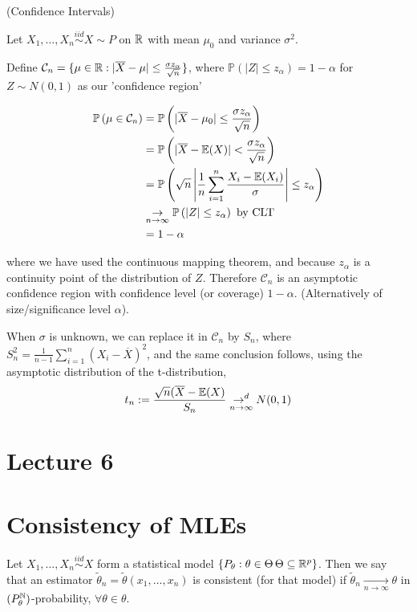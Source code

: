 \documentclass[a4paper]{article}
\begin{document}
\begin{eg} (Confidence Intervals)

	Let $X_1, \ldots, X_n \stackrel{iid}{\sim} X \sim P$ on $\mathbb{R}$ with mean  $\mu_{0}$ and variance $\sigma^2$.

	Define  $\mathcal{C}_n = \{\mu \in \mathbb{R} : |\overline{X} - \mu| \le \frac{\sigma z_{\alpha}}{\sqrt{n} }\} $, where $\mathbb{P}\left( |Z| \le z_{\alpha} \right) = 1 - \alpha $ for $Z\sim N(0,1)$ as our 'confidence region'

	\begin{align*}
		\mathbb{P}\left( \mu \in \mathcal{C}_n \right) &= \mathbb{P}\left( |\overline{X} - \mu_0| \le \frac{\sigma z_{\alpha}}{\sqrt{n} }  \right) \\
		&= \mathbb{P}\left( |\overline{X} - \mathbb{E}(X)| < \frac{\sigma z_{\alpha}}{\sqrt{n} } \right) \\
		&= \mathbb{P}\left( \sqrt{n} \left| \frac{1}{n} \sum_{i=1}^{n} \frac{X_i - \mathbb{E}(X_i)}{\sigma} \right| \le z_{\alpha} \right) \\
		&\underset{n \to \infty}{\to } \mathbb{P}\left( |Z| \le z_{\alpha} \right) \text{ by CLT} \\
		&= 1- \alpha
	\end{align*}

	where we have used the continuous mapping theorem, and because $z_{\alpha}$ is a continuity point of the distribution of $Z$. Therefore $\mathcal{C}_n$ is an asymptotic confidence region with confidence level (or coverage) $1-\alpha$. (Alternatively of size/significance level  $\alpha$).

	When  $\sigma$ is unknown, we can replace it in $\mathcal{C}_n$ by $S_n$, where  $S_{n}^2 = \frac{1}{n-1} \sum_{i=1}^{n}(X_i - \overline{X})^2$, and the same conclusion follows, using the asymptotic distribution of the t-distribution,
	\[
		t_n := \frac{\sqrt{n} (\overline{X} - \mathbb{E}(X)}{S_n} \underset{n \to \infty}{\to ^{d}} N(0,1)
	\] 
\end{eg}

\section*{Lecture 6}

\section{Consistency of MLEs}

\begin{defn}
	Let $X_1, \ldots, X_n \stackrel{iid}{\sim} X$ form a statistical model $\{P_{\theta} : \theta \in \Theta\, \Theta \subseteq \mathbb{R}^{p}\}$. Then we say that an estimator $\tilde{\theta}_{n} = \tilde{\theta}(x_1, \ldots, x_n)$ is consistent (for that model) if $\tilde{\theta}_n \underset{n\to \infty}{\to} \theta$ in $(P_\theta^{\mathbb{N}})$-probability, $\forall \theta \in \theta$.
\end{defn}
\end{document}

